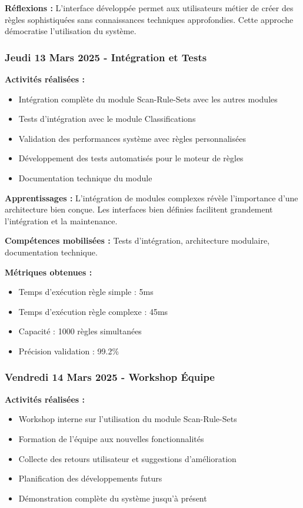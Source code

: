 \textbf{Réflexions :}
L'interface développée permet aux utilisateurs métier de créer des règles sophistiquées sans connaissances techniques approfondies. Cette approche démocratise l'utilisation du système.

\subsubsection{Jeudi 13 Mars 2025 - Intégration et Tests}

\textbf{Activités réalisées :}
\begin{itemize}
    \item Intégration complète du module Scan-Rule-Sets avec les autres modules
    \item Tests d'intégration avec le module Classifications
    \item Validation des performances système avec règles personnalisées
    \item Développement des tests automatisés pour le moteur de règles
    \item Documentation technique du module
\end{itemize}

\textbf{Apprentissages :}
L'intégration de modules complexes révèle l'importance d'une architecture bien conçue. Les interfaces bien définies facilitent grandement l'intégration et la maintenance.

\textbf{Compétences mobilisées :}
Tests d'intégration, architecture modulaire, documentation technique.

\textbf{Métriques obtenues :}
\begin{itemize}
    \item Temps d'exécution règle simple : 5ms
    \item Temps d'exécution règle complexe : 45ms
    \item Capacité : 1000 règles simultanées
    \item Précision validation : 99.2\%
\end{itemize}

\subsubsection{Vendredi 14 Mars 2025 - Workshop Équipe}

\textbf{Activités réalisées :}
\begin{itemize}
    \item Workshop interne sur l'utilisation du module Scan-Rule-Sets
    \item Formation de l'équipe aux nouvelles fonctionnalités
    \item Collecte des retours utilisateur et suggestions d'amélioration
    \item Planification des développements futurs
    \item Démonstration complète du système jusqu'à présent
\end{itemize}

